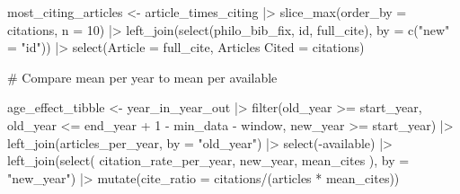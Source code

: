 \documentclass[
  10pt,
  letterpaper,
  DIV=11,
  numbers=noendperiod,
  twoside]{scrartcl}
\newenvironment{Shaded}{\begin{snugshade}}{\end{snugshade}}
\newcommand{\AttributeTok}[1]{\textcolor[rgb]{0.40,0.45,0.13}{#1}}
\newcommand{\CommentTok}[1]{\textcolor[rgb]{0.37,0.37,0.37}{#1}}
\newcommand{\DecValTok}[1]{\textcolor[rgb]{0.68,0.00,0.00}{#1}}
\newcommand{\FunctionTok}[1]{\textcolor[rgb]{0.28,0.35,0.67}{#1}}
\newcommand{\NormalTok}[1]{\textcolor[rgb]{0.00,0.23,0.31}{#1}}
\newcommand{\OtherTok}[1]{\textcolor[rgb]{0.00,0.23,0.31}{#1}}
\newcommand{\SpecialCharTok}[1]{\textcolor[rgb]{0.37,0.37,0.37}{#1}}
\newcommand{\StringTok}[1]{\textcolor[rgb]{0.13,0.47,0.30}{#1}}
\begin{document}
\begin{Shaded}
\begin{Highlighting}[]
\NormalTok{most\_citing\_articles }\OtherTok{\textless{}{-}}\NormalTok{ article\_times\_citing }\SpecialCharTok{|\textgreater{}}
  \FunctionTok{slice\_max}\NormalTok{(}\AttributeTok{order\_by =}\NormalTok{ citations, }\AttributeTok{n =} \DecValTok{10}\NormalTok{) }\SpecialCharTok{|\textgreater{}}
  \FunctionTok{left\_join}\NormalTok{(}\FunctionTok{select}\NormalTok{(philo\_bib\_fix, id, full\_cite), }\AttributeTok{by =} \FunctionTok{c}\NormalTok{(}\StringTok{"new"} \OtherTok{=} \StringTok{"id"}\NormalTok{)) }\SpecialCharTok{|\textgreater{}}
  \FunctionTok{select}\NormalTok{(}\AttributeTok{Article =}\NormalTok{ full\_cite, }\StringTok{\textasciigrave{}}\AttributeTok{Articles Cited}\StringTok{\textasciigrave{}} \OtherTok{=}\NormalTok{ citations)}

\CommentTok{\# Compare mean per year to mean per available}

\NormalTok{age\_effect\_tibble }\OtherTok{\textless{}{-}}\NormalTok{ year\_in\_year\_out }\SpecialCharTok{|\textgreater{}}
  \FunctionTok{filter}\NormalTok{(old\_year }\SpecialCharTok{\textgreater{}=}\NormalTok{ start\_year, old\_year }\SpecialCharTok{\textless{}=}\NormalTok{ end\_year }\SpecialCharTok{+} \DecValTok{1} \SpecialCharTok{{-}}\NormalTok{ min\_data }\SpecialCharTok{{-}}\NormalTok{ window, new\_year }\SpecialCharTok{\textgreater{}=}\NormalTok{ start\_year) }\SpecialCharTok{|\textgreater{}}
  \FunctionTok{left\_join}\NormalTok{(articles\_per\_year, }\AttributeTok{by =} \StringTok{"old\_year"}\NormalTok{) }\SpecialCharTok{|\textgreater{}}
  \FunctionTok{select}\NormalTok{(}\SpecialCharTok{{-}}\NormalTok{available) }\SpecialCharTok{|\textgreater{}}
  \FunctionTok{left\_join}\NormalTok{(}\FunctionTok{select}\NormalTok{(}
\NormalTok{    citation\_rate\_per\_year, new\_year, mean\_cites}
\NormalTok{  ), }\AttributeTok{by =} \StringTok{"new\_year"}\NormalTok{) }\SpecialCharTok{|\textgreater{}}
  \FunctionTok{mutate}\NormalTok{(}\AttributeTok{cite\_ratio =}\NormalTok{ citations}\SpecialCharTok{/}\NormalTok{(articles }\SpecialCharTok{*}\NormalTok{ mean\_cites))}


\end{Highlighting}
\end{Shaded}
\end{document}
